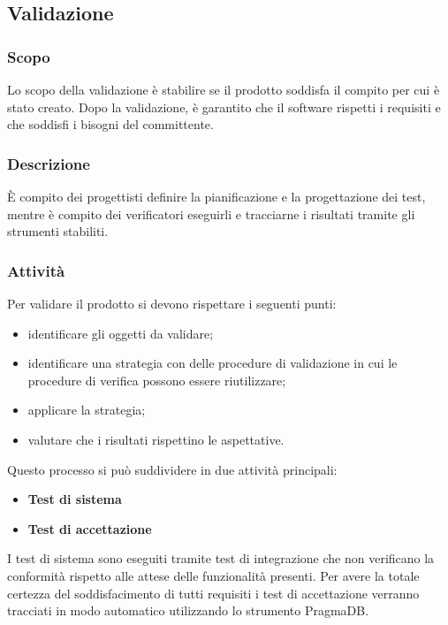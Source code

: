 {\subsection{Validazione}
	\subsubsection{Scopo}
	Lo scopo della validazione è stabilire se il prodotto soddisfa il compito per cui è stato creato. Dopo la validazione, è garantito che il software rispetti i requisiti e che soddisfi i bisogni del committente.

	\subsubsection{Descrizione}
	\`E compito dei progettisti definire la pianificazione e la progettazione dei test, mentre è compito dei verificatori eseguirli e tracciarne i risultati tramite gli strumenti stabiliti.
	\subsubsection{Attività}
	Per validare il prodotto si devono rispettare i seguenti punti:
	\begin{itemize}
		\item identificare gli oggetti da validare;
		\item identificare una strategia con delle procedure di validazione in cui le procedure di verifica possono essere riutilizzare;
		\item applicare la strategia;
		\item valutare che i risultati rispettino le aspettative.
	\end{itemize}
	Questo processo si può suddividere in due attività principali:
	\begin{itemize}
		\item \textbf{Test di sistema}
		\item \textbf{Test di accettazione}
	\end{itemize}
	I test di sistema sono eseguiti tramite test di integrazione che non verificano la conformità rispetto alle attese delle funzionalità presenti. Per avere la totale certezza del soddisfacimento di tutti requisiti i test di accettazione verranno tracciati in modo automatico utilizzando lo strumento PragmaDB.
	
}
